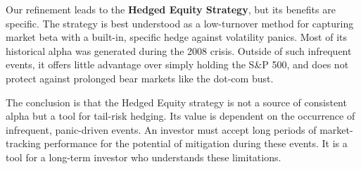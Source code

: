 \documentclass{article}
\begin{document}
Our refinement leads to the \textbf{Hedged Equity Strategy}, but its benefits are specific. The strategy is best understood as a low-turnover method for capturing market beta with a built-in, specific hedge against volatility panics. Most of its historical alpha was generated during the 2008 crisis. Outside of such infrequent events, it offers little advantage over simply holding the S\&P 500, and does not protect against prolonged bear markets like the dot-com bust.

The conclusion is that the Hedged Equity strategy is not a source of consistent alpha but a tool for tail-risk hedging. Its value is dependent on the occurrence of infrequent, panic-driven events. An investor must accept long periods of market-tracking performance for the potential of mitigation during these events. It is a tool for a long-term investor who understands these limitations.
\end{document}
